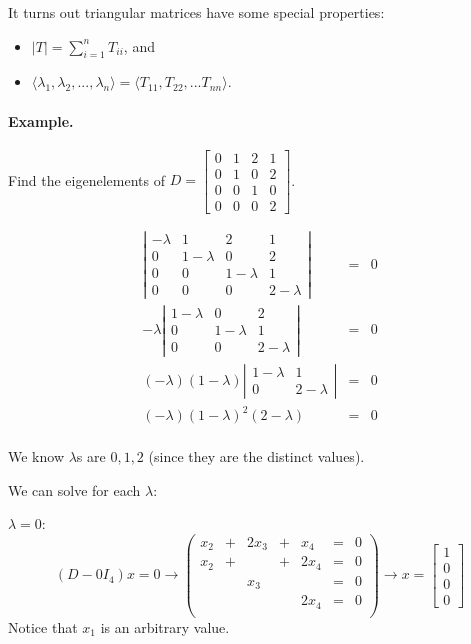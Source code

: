 It turns out triangular matrices have some special properties: 
\begin{itemize}
\item $\displaystyle |T| = \sum_{i=1}^n T_{ii}$, and 
\item $\langle \lambda_1, \lambda_2, ..., \lambda_n\rangle = \langle T_{11}, T_{22}, ... T_{nn}\rangle$. 
\end{itemize}

\paragraph{Example.} Find the eigenelements of $D=\begin{bmatrix}0&1&2&1\\0&1&0&2\\0&0&1&0\\0&0&0&2\end{bmatrix}$.

\[\begin{array}{rcl}
\left|\begin{matrix}-\lambda&1&2&1\\0&1-\lambda&0&2\\0&0&1-\lambda&1\\0 & 0 & 0 & 2-\lambda\end{matrix}\right| & = & 0\\
-\lambda\left|\begin{matrix}1-\lambda&0&2\\0&1-\lambda&1\\0 & 0 & 2-\lambda\end{matrix}\right| & = & 0\\
(-\lambda)(1-\lambda)\left|\begin{matrix}1-\lambda&1\\0 & 2-\lambda\end{matrix}\right| & = & 0\\
(-\lambda)(1-\lambda)^2(2-\lambda) & = & 0\\
\end{array}\]

We know $\lambda$s are $0,1,2$ (since they are the distinct values). 

We can solve for each $\lambda$:

$\lambda=0$: 
\[(D-0I_4)x = 0 \rightarrow \left(\begin{array}{rcrcrcr} x_2 & + & 2x_3 & + & x_4 & = & 0\\ x_2 & + &  & + & 2x_4 & = & 0\\ &  & x_3 &&&  = & 0\\ & &&& 2x_4 & = & 0\\\end{array}\right)\rightarrow x = \begin{bmatrix}1\\0\\0\\0\end{bmatrix}\]
Notice that $x_1$ is an arbitrary value. 

